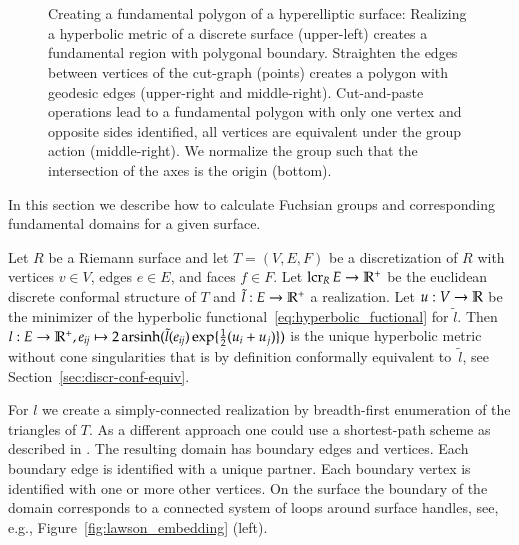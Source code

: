 \documentclass[Thesis.tex]{subfiles}
\begin{document}
\begin{figure}
\centering
{}\\
\\
\caption{
Creating a fundamental polygon of a hyperelliptic surface:
Realizing a hyperbolic metric of a discrete surface (upper-left) creates a fundamental region with polygonal boundary.
Straighten the edges between vertices of the cut-graph (points) creates a polygon with geodesic edges (upper-right and middle-right).
Cut-and-paste operations lead to a fundamental polygon with only one vertex and opposite sides identified, all vertices are equivalent under the group action (middle-right).
We normalize the group such that the intersection of the axes is the origin (bottom).
}
\label{fig:fundamental_polygon_algorithm}
\end{figure}

In this section we describe how to calculate Fuchsian groups and corresponding fundamental domains for a given surface.

Let $R$ be a Riemann surface and let $T=(V, E, F)$ be a discretization of $R$ with vertices $v\in V$, edges $e\in E$, and faces $f\in F$. Let $\operatorname{lcr}_R E\to \mathbb R^+$ be the euclidean discrete conformal structure of $T$ and $\tilde l:E\to \mathbb R^+$ a realization. Let $u:V\to \mathbb R$ be the minimizer of the hyperbolic functional~\ref{eq:hyperbolic_fuctional} for $\tilde l$. Then $l:E \to \mathbb R^+, e_{\it ij}\mapsto 2\operatorname{arsinh}(\tilde l(e_{\it ij})\exp\{\frac{1}{2}(u_i+u_j)\})$ is the unique hyperbolic metric without cone singularities that is by definition conformally equivalent to~$\tilde l$, see Section~\ref{sec:discr-conf-equiv}.

For $l$ we create a simply-connected realization by breadth-first enumeration of the triangles of $T$. As a different approach one could use a shortest-path scheme as described in \cite{EricksonH02}.  The resulting domain has boundary edges and vertices. Each boundary edge is identified with a unique partner. Each boundary vertex is identified with one or more other vertices. On the surface the boundary of the domain corresponds to a connected system of loops around surface handles, see, e.g., Figure~\ref{fig:lawson_embedding} (left).
\end{document}
